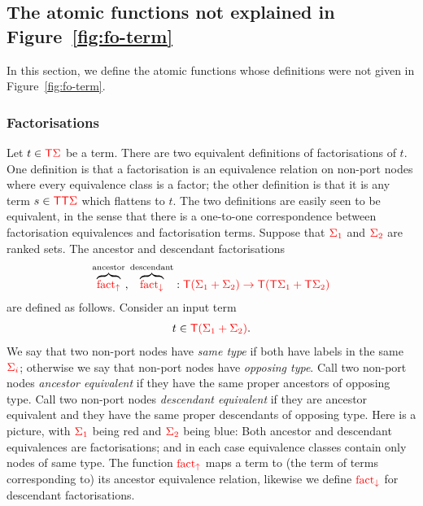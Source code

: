\subsection{The atomic functions not explained in Figure~\ref{fig:fo-term}}
\label{sec:atomic-and-combinators}
In this section, we define the atomic functions whose definitions were not given in Figure~\ref{fig:fo-term}. 




\subsubsection{Factorisations}
    Let $t \in {\color{red}{\mathsf T}} {\color{red}{\Sigma}}$ be a term. 
    There are two equivalent definitions of factorisations of $t$. One definition is that a factorisation is an equivalence relation on non-port nodes where every equivalence class is a factor; the other definition is that it is any term $s  \in {\color{red}{\mathsf T}} {\color{red}{\mathsf T}} {\color{red}{\Sigma}}$ which flattens to $t$. 
    The two definitions are easily seen to be equivalent, in the sense that there is a one-to-one correspondence between factorisation equivalences and factorisation terms.
    Suppose that ${\color{red}{\Sigma_1}}$ and ${\color{red}{\Sigma_2}}$ are ranked sets. The ancestor and descendant factorisations 
        \begin{align*}
            \overbrace{{\color{red}{\mathrm{fact_{\uparrow}}}}}^{\text{ancestor}}, \overbrace{{\color{red}{\mathrm{fact_{\downarrow}}}}}^{\text{descendant}}  : {\color{red}{{\color{red}{\mathsf T}}(\Sigma_1+\Sigma_2) \to {\color{red}{\mathsf T}}({\color{red}{\mathsf T}}\Sigma_1 + {\color{red}{\mathsf T}}\Sigma_2)}}
        \end{align*}
        are defined as follows. Consider an input term
        \begin{align*}
            t \in {\color{red}{{\color{red}{\mathsf T}}(\Sigma_1+\Sigma_2)}}.
        \end{align*}
        We say that two non-port nodes have \emph{same type} if both have labels in the same  ${\color{red}{\Sigma_i}}$; otherwise we say that non-port nodes have \emph{opposing type}.  Call two non-port nodes \emph{ancestor equivalent}  if they have the same proper ancestors of opposing type. Call two non-port nodes \emph{descendant equivalent}  if they  are ancestor equivalent and they have the same proper descendants of opposing type. Here is a picture, with ${\color{red}{\Sigma_1}}$ being red and ${\color{red}{\Sigma_2}}$ being blue: 
        Both ancestor and descendant equivalences are factorisations; and in each case equivalence classes contain only nodes of same type.  The function ${\color{red}{\mathrm{fact_{\uparrow}}}}$ maps a term to (the term of terms corresponding to) its ancestor equivalence relation, likewise we define ${\color{red}{\mathrm{fact_{\downarrow}}}}$ for  descendant factorisations.
    
